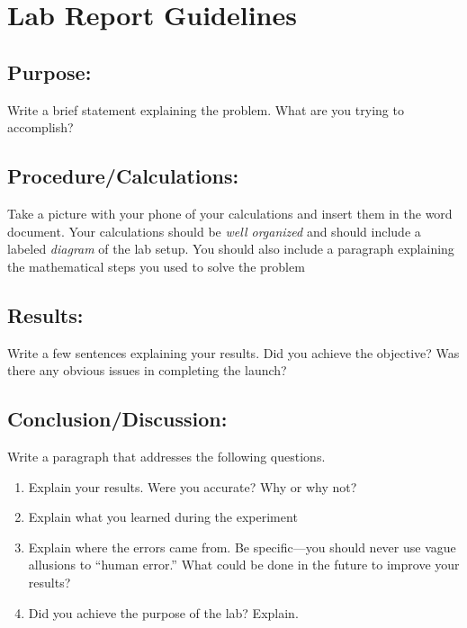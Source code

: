 \documentclass[10pt]{exam}
\begin{document}
\pagebreak


\section*{Lab Report Guidelines}

\subsection*{Purpose:}  
Write a brief statement explaining the problem.  What are you trying to accomplish?


\subsection*{Procedure/Calculations:}
Take a picture with your phone of your calculations and insert them in the word document.  Your calculations should be \emph{well organized} and should include a labeled \emph{diagram} of the lab setup.  You should also include a paragraph explaining the mathematical steps you used to solve the problem 

\subsection*{Results:}
Write a few sentences explaining your results.  Did you achieve the objective?  Was there any obvious issues in completing the launch?

\subsection*{Conclusion/Discussion:}
Write a paragraph that addresses the following questions.

\begin{enumerate}
  \item Explain your results. Were you accurate?  Why or why not? 
  \item Explain what you learned during the experiment
  \item Explain where the errors came from.  Be specific—you should never use vague allusions to “human error.”  What could be done in the future to improve your results?
  \item Did you achieve the purpose of the lab?  Explain.
\end{enumerate}
	
\end{document}
